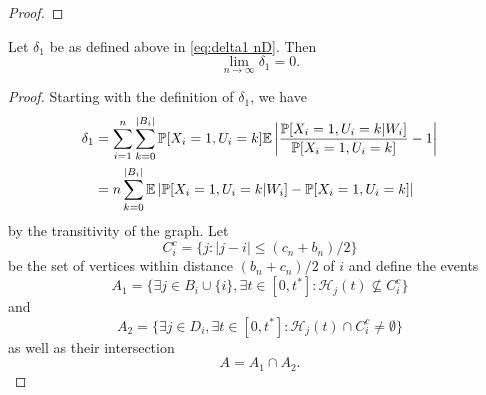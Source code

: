 	\begin{lemma}
	\end{lemma}
	\begin{proof}
		
	\end{proof}

	\begin{lemma}
	\label{lem:delta1 goes to 0 general}
		Let $\delta_1$ be as defined above in \eqref{eq:delta1 nD}. Then
		\begin{equation}
			\lim_{n\rightarrow\infty} \delta_1 = 0.
		\end{equation}
	\end{lemma}
	\begin{proof}
		Starting with the definition of $\delta_1$, we have
		\begin{align}
			\delta_1 &= \sum_{i = 1}^n \sum_{k = 0}^{|B_i|} \prob[X_i = 1, U_i = k] \expect \left| \frac{\prob[X_i = 1, U_i = k|W_i]}{\prob[X_i = 1, U_i = k]} - 1 \right|\\
			&= n \sum_{k = 0}^{|B_i|} \expect \left|\prob[X_i = 1, U_i = k|W_i] - \prob[X_i = 1, U_i = k] \right|%
			\label{eq:nD delta1 line 2}
		\end{align}
		by the transitivity of the graph.
		Let
		\begin{equation}
			C_i^c = \{j : |j - i| \leq (c_n + b_n)/2\}
		\end{equation}
		be the set of vertices within distance $(b_n + c_n)/2$ of $i$ and define the events
		\begin{equation}
			A_1 = \{\exists j \in B_i \cup \{i\}, \exists t \in [0, t^*] : \mathcal{H}_j(t) \nsubseteq  C_i^c\}
		\end{equation}
		and
		\begin{equation}
			A_2 = \{\exists j \in D_i, \exists t \in [0, t^*] : \mathcal{H}_j(t) \cap C_i^c \neq \emptyset\}
		\end{equation}
		as well as their intersection
		\begin{equation}
			A = A_1 \cap A_2.
		\end{equation}


\end{proof}
